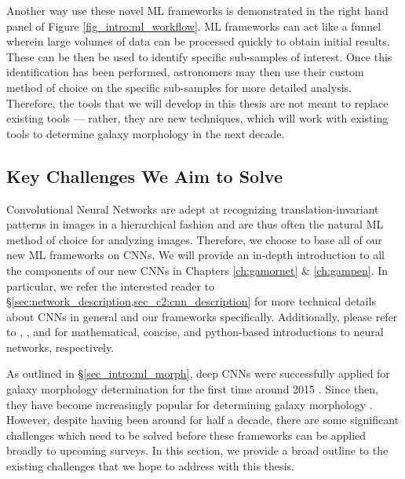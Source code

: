 Another way use these novel ML frameworks is demonstrated in the right hand panel of Figure \ref{fig_intro:ml_workflow}. ML frameworks can act like a funnel wherein large volumes of data can be processed quickly to obtain initial results. These can be then be used to identify specific sub-samples of interest. Once this identification has been performed, astronomers may then use their custom method of choice on the specific sub-samples for more detailed analysis. Therefore, the tools that we will develop in this thesis are not meant to replace existing tools --- rather, they are new techniques, which will work with existing tools to determine galaxy morphology in the next decade. 


\subsection{Key Challenges We Aim to Solve} \label{sec_intro:challenges}

Convolutional Neural Networks are adept at recognizing translation-invariant patterns in images in a hierarchical fashion and are thus often the natural ML method of choice for analyzing images. Therefore, we choose to base all of our new ML frameworks on CNNs. We will provide an in-depth introduction to all the components of our new CNNs in Chapters \ref{ch:gamornet} \& \ref{ch:gampen}. In particular, we refer the interested reader to \S \ref{sec:network_description,sec_c2:cnn_description} for more technical details about CNNs in general and our frameworks specifically. Additionally, please refer to \citet{mckay_03}, \citet{nielsen}, and \citet{chollet_21} for mathematical, concise, and python-based introductions to neural networks, respectively.

As outlined in \S \ref{sec_intro:ml_morph}, deep CNNs were successfully applied for galaxy morphology determination for the first time around 2015 \citep{Dieleman2015Rotation-invariantPrediction, Huertas-Company2015ALEARNING}. Since then, they have become increasingly popular for determining galaxy morphology \citep[e.g.,][]{Tuccillo2018DeepFitting, Hausen2020MorpheusData, Walmsley2020GalaxyLearning, Cheng2021GalaxyNetworks, Vega-Ferrero2021PushingSurvey, Tarsitano2022ImageLearning}. However, despite having been around for half a decade, there are some significant challenges which need to be solved before these frameworks can be applied broadly to upcoming surveys. In this section, we provide a broad outline to the existing challenges that we hope to address with this thesis. 

